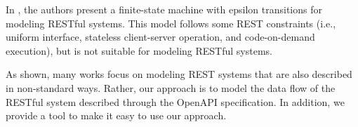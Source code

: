 In \cite{zuzak2011formal}, the authors present a finite-state machine with epsilon transitions for modeling RESTful systems. This model follows some REST constraints (i.e., uniform interface, stateless client-server operation, and code-on-demand execution), but is not suitable for modeling RESTful systems.






As shown, many works focus on modeling REST systems that are also described in non-standard ways. Rather, our approach is to model the data flow of the RESTful system described through the OpenAPI specification. In addition, we provide a tool to make it easy to use our approach.